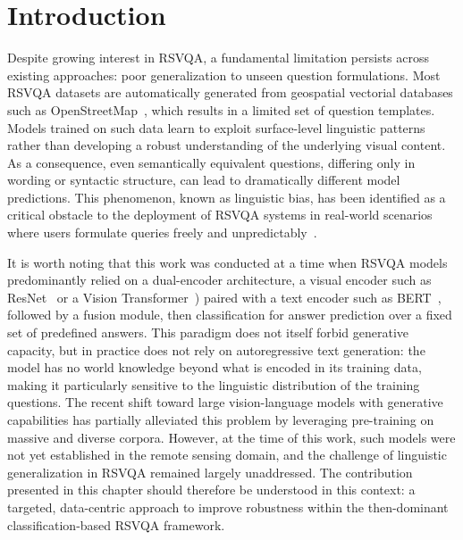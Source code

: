 
\section{Introduction}
\label{sec:chap3_intro}
 
Despite growing interest in RSVQA, a fundamental limitation
persists across existing approaches: poor generalization to unseen
question formulations. Most RSVQA datasets are automatically
generated from geospatial vectorial databases such as OpenStreetMap~\cite{osm}\cite{lobry2020rsvqa},
which results in a limited set of question
templates. Models trained on such data learn to exploit
surface-level linguistic patterns rather than developing a robust
understanding of the underlying visual content. As a
consequence, even semantically equivalent questions,
differing only in wording or syntactic structure, can lead to
dramatically different model predictions. This phenomenon,
known as linguistic bias, has been identified as a critical
obstacle to the deployment of RSVQA systems in real-world
scenarios where users formulate queries freely and
unpredictably~\cite{chappuis2025langbias}.
 
It is worth noting that this work was conducted at a time when
RSVQA models predominantly relied on a dual-encoder
architecture, a visual encoder such as ResNet~\cite{he2015deepresiduallearningimage} or a Vision
Transformer~\cite{dosovitskiy2021imageworth16x16words})
paired with a text encoder such as BERT~\cite{sanh2019distilbert},
 followed by a fusion module, then classification for answer
prediction over a fixed set of predefined answers. This
paradigm does not itself forbid generative capacity, but in
practice does not rely on autoregressive text generation: the model has no world
knowledge beyond what is encoded in its training data, making
it particularly sensitive to the linguistic distribution of the
training questions. The recent shift toward large
vision-language models with generative capabilities has
partially alleviated this problem by leveraging pre-training on
massive and diverse corpora. However, at the time of this
work, such models were not yet established in the remote
sensing domain, and the challenge of linguistic generalization
in RSVQA remained largely unaddressed. The contribution
presented in this chapter should therefore be understood in
this context: a targeted, data-centric approach to improve
robustness within the then-dominant classification-based RSVQA
framework.
 
